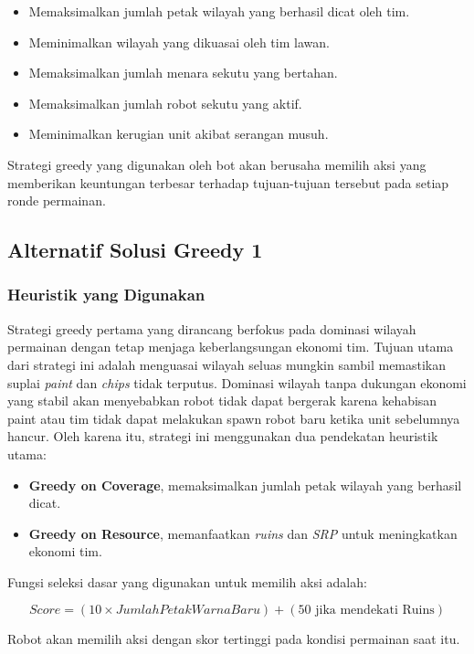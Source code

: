 \documentclass{article}
\begin{document}
\begin{itemize}
\item Memaksimalkan jumlah petak wilayah yang berhasil dicat oleh tim.
\item Meminimalkan wilayah yang dikuasai oleh tim lawan.
\item Memaksimalkan jumlah menara sekutu yang bertahan.
\item Memaksimalkan jumlah robot sekutu yang aktif.
\item Meminimalkan kerugian unit akibat serangan musuh.
\end{itemize}

Strategi greedy yang digunakan oleh bot akan berusaha memilih aksi yang memberikan keuntungan terbesar terhadap tujuan-tujuan tersebut pada setiap ronde permainan.


\subsection{Alternatif Solusi Greedy 1}

\subsubsection{Heuristik yang Digunakan}

Strategi greedy pertama yang dirancang berfokus pada dominasi wilayah permainan dengan tetap menjaga keberlangsungan ekonomi tim. Tujuan utama dari strategi ini adalah menguasai wilayah seluas mungkin sambil memastikan suplai \textit{paint} dan \textit{chips} tidak terputus.
Dominasi wilayah tanpa dukungan ekonomi yang stabil akan menyebabkan robot tidak dapat bergerak karena kehabisan paint atau tim tidak dapat melakukan spawn robot baru ketika unit sebelumnya hancur. Oleh karena itu, strategi ini menggunakan dua pendekatan heuristik utama:

\begin{itemize}
\item \textbf{Greedy on Coverage}, memaksimalkan jumlah petak wilayah yang berhasil dicat.
\item \textbf{Greedy on Resource}, memanfaatkan \textit{ruins} dan \textit{SRP} untuk meningkatkan ekonomi tim.
\end{itemize}

Fungsi seleksi dasar yang digunakan untuk memilih aksi adalah:

\[
Score = (10 \times JumlahPetakWarnaBaru) + (50 \text{ jika mendekati Ruins})
\]

Robot akan memilih aksi dengan skor tertinggi pada kondisi permainan saat itu.
\end{document}
